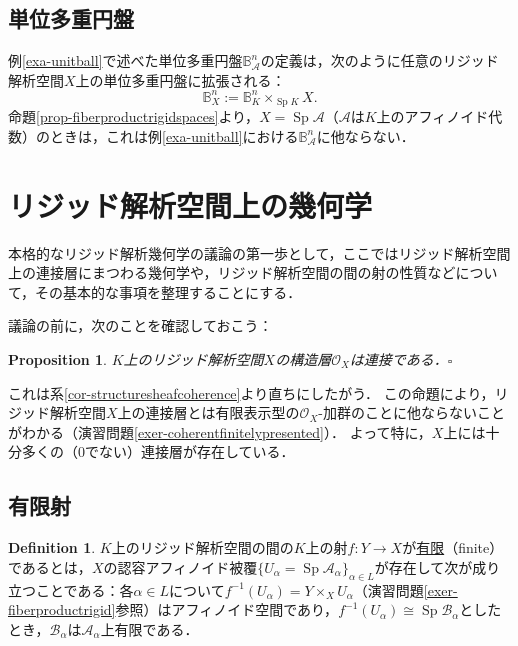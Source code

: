 \documentclass[a4paper,12pt, dvipdfmx]{jsbook}
\def\B{\mathbb{B}}
\def\O{\mathscr{O}}
\def\Sp{\mathop{\mathrm{Sp}}\nolimits}
\theoremstyle{plain}
\newtheorem{prop}[thm]{\bfseries Proposition}
\theoremstyle{definition}
\newtheorem{dfn}[thm]{\bfseries Definition}
\begin{document}
\subsection{単位多重円盤}\label{sub-polydisk}
例\ref{exa-unitball}で述べた単位多重円盤$\B^n_{\mathcal{A}}$の定義は，次のように任意のリジッド解析空間$X$上の単位多重円盤に拡張される：
$$
\B^n_X:=\B^n_K\times_{\Sp K}X.
$$
命題\ref{prop-fiberproductrigidspaces}より，$X=\Sp\mathcal{A}$（$\mathcal{A}$は$K$上のアフィノイド代数）のときは，これは例\ref{exa-unitball}における$\B^n_{\mathcal{A}}$に他ならない．

\section{リジッド解析空間上の幾何学}\label{sec-geometryrigidanalyticspaces}
本格的なリジッド解析幾何学の議論の第一歩として，ここではリジッド解析空間上の連接層にまつわる幾何学や，リジッド解析空間の間の射の性質などについて，その基本的な事項を整理することにする．

議論の前に，次のことを確認しておこう：
\begin{prop}\label{prop-coherencestructuresheafgen}{\rm 
$K$上のリジッド解析空間$X$の構造層$\O_X$は連接である．}\hfill$\square$
\end{prop}

これは系\ref{cor-structuresheafcoherence}より直ちにしたがう．
この命題により，リジッド解析空間$X$上の連接層とは有限表示型の$\O_X$-加群のことに他ならないことがわかる（演習問題\ref{exer-coherentfinitelypresented}）．
よって特に，$X$上には十分多くの（$0$でない）連接層が存在している．

\subsection{有限射}\label{sub-finitemorphisms}
\begin{dfn}\label{dfn-finitemorphisms}{\rm 
$K$上のリジッド解析空間の間の$K$上の射$f\colon Y\rightarrow X$が\underline{有限}（finite）であるとは，$X$の認容アフィノイド被覆$\{U_{\alpha}=\Sp\mathcal{A}_{\alpha}\}_{\alpha\in L}$が存在して次が成り立つことである：各$\alpha\in L$について$f^{-1}(U_{\alpha})=Y\times_XU_{\alpha}$（演習問題\ref{exer-fiberproductrigid}参照）はアフィノイド空間であり，$f^{-1}(U_{\alpha})\cong\Sp\mathcal{B}_{\alpha}$としたとき，$\mathcal{B}_{\alpha}$は$\mathcal{A}_{\alpha}$上有限である．}
\end{dfn}
\end{document}
